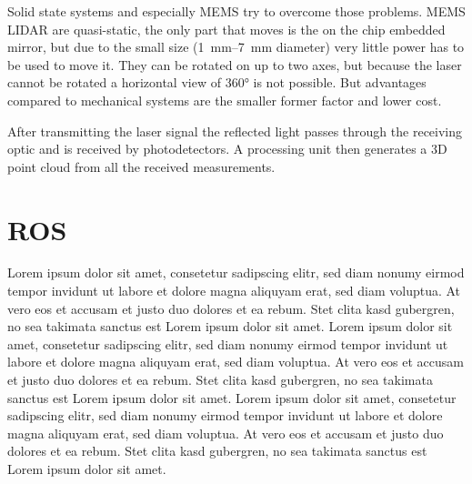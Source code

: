 Solid state systems and especially MEMS try to overcome those problems.
MEMS LIDAR are quasi-static, the only part that moves is the on the chip embedded mirror, but due to the small size (\SIrange{1}{7}{\milli\metre} diameter) very little power has to be used to move it.
They can be rotated on up to two axes, but because the laser cannot be rotated a horizontal view of 360° is not possible.
But advantages compared to mechanical systems are the smaller former factor and lower cost.

After transmitting the laser signal the reflected light passes through the receiving optic and is received by photodetectors.
A processing unit then generates a 3D point cloud from all the received measurements.

\cite{Wang2020}
\cite{Vaughan2006}

\section{ROS}
Lorem ipsum dolor sit amet, consetetur sadipscing elitr, sed diam nonumy eirmod tempor invidunt ut labore et dolore magna aliquyam erat, sed diam voluptua. At vero eos et accusam et justo duo dolores et ea rebum. Stet clita kasd gubergren, no sea takimata sanctus est Lorem ipsum dolor sit amet. Lorem ipsum dolor sit amet, consetetur sadipscing elitr, sed diam nonumy eirmod tempor invidunt ut labore et dolore magna aliquyam erat, sed diam voluptua. At vero eos et accusam et justo duo dolores et ea rebum. Stet clita kasd gubergren, no sea takimata sanctus est Lorem ipsum dolor sit amet. Lorem ipsum dolor sit amet, consetetur sadipscing elitr, sed diam nonumy eirmod tempor invidunt ut labore et dolore magna aliquyam erat, sed diam voluptua. At vero eos et accusam et justo duo dolores et ea rebum. Stet clita kasd gubergren, no sea takimata sanctus est Lorem ipsum dolor sit amet.


